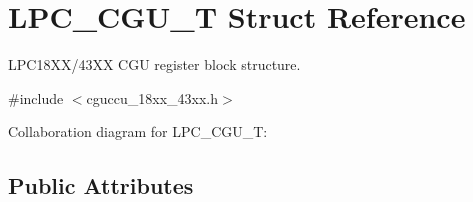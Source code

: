 \hypertarget{struct_l_p_c___c_g_u___t}{}\section{L\+P\+C\+\_\+\+C\+G\+U\+\_\+T Struct Reference}
\label{struct_l_p_c___c_g_u___t}


L\+P\+C18\+X\+X/43\+XX C\+GU register block structure.  




{\ttfamily \#include $<$cguccu\+\_\+18xx\+\_\+43xx.\+h$>$}



Collaboration diagram for L\+P\+C\+\_\+\+C\+G\+U\+\_\+T\+:
\subsection*{Public Attributes}
